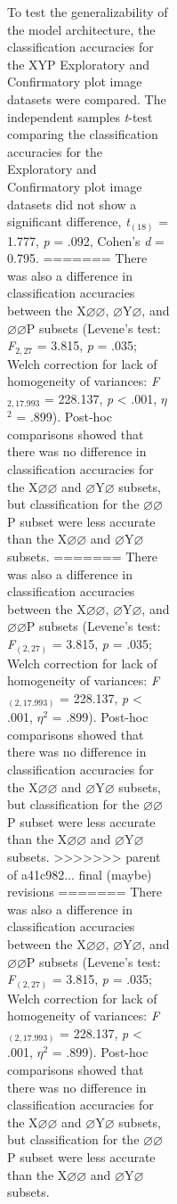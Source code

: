 \documentclass[
  english,
  man, donotrepeattitle,floatsintext]{apa6}
\begin{document}
\begin{figure}
\begin{figure}
\begin{figure}
\begin{figure}
To test the generalizability of the model architecture, the classification accuracies for the XYP Exploratory and Confirmatory plot image datasets were compared. The independent samples \emph{t}-test comparing the classification accuracies for the Exploratory and Confirmatory plot image datasets did not show a significant difference, \emph{t}\(_{(18)}\) = 1.777, \emph{p} = .092, Cohen's \emph{d} = 0.795.
=======
There was also a difference in classification accuracies between the X\(\varnothing\varnothing\), \(\varnothing\)Y\(\varnothing\), and \(\varnothing\varnothing\)P subsets (Levene's test: \emph{F}\(_{2, 27}\) = 3.815, \emph{p} = .035; Welch correction for lack of homogeneity of variances: \emph{F}\(_{2, 17.993}\) = 228.137, \emph{p} \textless{} .001, \textit{$\eta$}\(^{2}\) = .899). Post-hoc comparisons showed that there was no difference in classification accuracies for the X\(\varnothing\varnothing\) and \(\varnothing\)Y\(\varnothing\) subsets, but classification for the \(\varnothing\varnothing\)P subset were less accurate than the X\(\varnothing\varnothing\) and \(\varnothing\)Y\(\varnothing\) subsets.
=======
There was also a difference in classification accuracies between the X\(\varnothing\varnothing\), \(\varnothing\)Y\(\varnothing\), and \(\varnothing\varnothing\)P subsets (Levene's test: \emph{F}\(_{(2, 27)}\) = 3.815, \emph{p} = .035; Welch correction for lack of homogeneity of variances: \emph{F}\(_{(2, 17.993)}\) = 228.137, \emph{p} \textless{} .001, \textit{$\eta$}\(^{2}\) = .899). Post-hoc comparisons showed that there was no difference in classification accuracies for the X\(\varnothing\varnothing\) and \(\varnothing\)Y\(\varnothing\) subsets, but classification for the \(\varnothing\varnothing\)P subset were less accurate than the X\(\varnothing\varnothing\) and \(\varnothing\)Y\(\varnothing\) subsets.
>>>>>>> parent of a41c982... final (maybe) revisions
=======
There was also a difference in classification accuracies between the X\(\varnothing\varnothing\), \(\varnothing\)Y\(\varnothing\), and \(\varnothing\varnothing\)P subsets (Levene's test: \emph{F}\(_{(2, 27)}\) = 3.815, \emph{p} = .035; Welch correction for lack of homogeneity of variances: \emph{F}\(_{(2, 17.993)}\) = 228.137, \emph{p} \textless{} .001, \textit{$\eta$}\(^{2}\) = .899). Post-hoc comparisons showed that there was no difference in classification accuracies for the X\(\varnothing\varnothing\) and \(\varnothing\)Y\(\varnothing\) subsets, but classification for the \(\varnothing\varnothing\)P subset were less accurate than the X\(\varnothing\varnothing\) and \(\varnothing\)Y\(\varnothing\) subsets.

\end{figure}
\end{figure}
\end{figure}
\end{figure}
\end{document}

